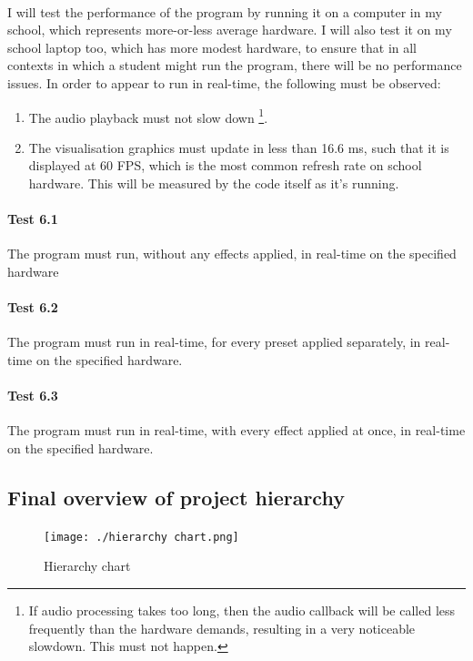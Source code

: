 \paragraph{}
I will test the performance of the program by running it on a computer in my school, which represents more-or-less average hardware.
I will also test it on my school laptop too, which has more modest hardware, to ensure that in all contexts in which a student might run the program, there will be no performance issues.
In order to appear to run in real-time, the following must be observed:
\begin{enumerate}
	\item The audio  playback must not slow down \footnote{If audio processing takes too long, then the audio callback will be called less frequently than the hardware demands, resulting
		in a very noticeable slowdown. This must not happen.}.
	\item The visualisation graphics must update in less than 16.6 ms, such that it is displayed at 60 FPS, which is the most common refresh rate on school hardware. This will be measured by
	the code itself as it's running.
\end{enumerate}

\paragraph{Test 6.1} The program must run, without any effects applied, in real-time on the specified hardware
\paragraph{Test 6.2} The program must run in real-time, for every preset applied separately, in real-time on the specified hardware.
\paragraph{Test 6.3} The program must run in real-time, with every effect applied at once, in real-time on the specified hardware.

\pagebreak
\subsection{Final overview of project hierarchy}
\begin{figure}[H]
	\texttt{[image: ./hierarchy chart.png]}
	\caption{Hierarchy chart }
\end{figure}
